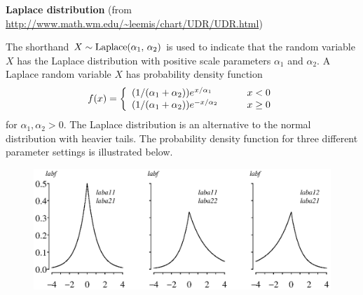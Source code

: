 \documentclass[12pt,fullpage]{article}
\begin{document}
\noindent
{\bf Laplace distribution} (from \color{blue}\url{http://www.math.wm.edu/~leemis/chart/UDR/UDR.html}\color{black})

\noindent
The shorthand $X \sim {\rm Laplace}(\alpha_1, \, \alpha_2)$ is used to indicate
that the random variable $X$ has the Laplace distribution with
positive scale parameters $\alpha_1$ and $\alpha_2$. A Laplace random variable $X$ has probability density function
$$
f(x) = \left\{ \begin{array}{ll}
(1/(\alpha_1 + \alpha_2))e^{\kern 0.04em x/\alpha_1} & \qquad x < 0 \\
(1/(\alpha_1 + \alpha_2))e^{-x/\alpha_2} & \qquad x \geq 0
\end{array}
\right.
$$
for $\alpha_1, \alpha_2 > 0$.
The Laplace distribution is an alternative to the normal distribution with heavier tails.
The probability density function for three different parameter settings is illustrated below.

\begin{figure}[h!]
\begin{center}
\includegraphics[width=5.2in]{LaplacePlot.ps}
\end{center}
\end{figure}
\end{document}
